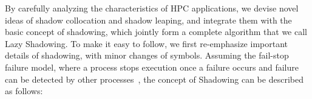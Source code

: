 By carefully analyzing the characteristics of HPC applications, we devise novel ideas 
of shadow collocation and shadow leaping, and integrate them with the basic concept of shadowing, which jointly form a complete algorithm that we call Lazy Shadowing. 
To make it easy to follow, we first re-emphasize important details of shadowing, with minor changes of symbols.
Assuming the fail-stop failure model, where a process stops execution once a failure
occurs and failure can be detected by other
processes~\cite{gartner_faults_1999,cristian_comm_1991}, 
the concept of Shadowing can be described as follows:
